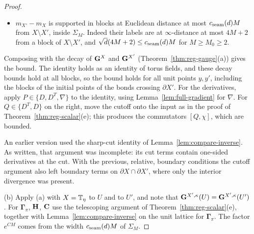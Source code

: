 \begin{proof}
\begin{itemize}
\[
[X_i^TM_iY_i,\chi]=[X_i^T,\chi]M_iY_i+X_i^T[M_i,\chi]Y_i+X_i^TM_i[Y_i,\chi].
\]
The commutators of $D$ and $D^T$ with $\chi$ are bounded and supported where $\partial\chi\ne0$. If $M_i$ has decay $(C,\gamma)$, then $\|\one_y[M_i,\chi]\one_{y'}\|\le2Ce^{-\gamma|y-y'|}$, and it vanishes unless $y$ or $y'$ lies within distance $3+\sqrt d$ of $X\setminus X'$; so $[M_i,\chi]$ has the seam form. The derivative $X_i^T$ on the left is absorbed by $\bG^{X'}$, since $\bG^{X'}D^T$ and $\bG^{X'}D$ decay (Theorem~\ref{thm:reg-gauge}(a)). The derivative $Y_i$ on the right falls on $u$, and $D\bG^X$, $D^T\bG^X$ decay. With $P$ on the left and $Q$ on the right, as below, the products $P\bG^{X'}X_i^T$ and $Y_i\bG^XQ$ also decay.
\item $m_{X'}-m_X$ is supported in blocks at Euclidean distance at most $c_{\rm seam}(d)M$ from $X\setminus X'$, inside $\Sigma_M$. Indeed their labels are at $\infty$-distance at most $4M+2$ from a block of $X\setminus X'$, and $\sqrt d(4M+2)\le c_{\rm seam}(d)M$ for $M\ge M_0\ge2$.
\end{itemize}
Composing with the decay of $\mathbf G^X$ and $\bG^{X'}$ (Theorem~\ref{thm:reg-gauge}(a)) gives the bound. The identity holds as an identity of torus fields, and these decay bounds hold at all blocks, so the bound holds for all unit points $y,y'$, including the blocks of the initial points of the bonds crossing $\partial X'$. For the derivatives, apply $P\in\{D,D^T,\nabla\}$ to the identity, using Lemma~\ref{lem:full-gradient} for $\nabla$. For $Q\in\{D^T,D\}$ on the right, move the cutoff onto the input as in the proof of Theorem~\ref{thm:reg-scalar}(e); this produces the commutators $[Q,\chi]$, which are bounded.

An earlier version used the sharp-cut identity of Lemma~\ref{lem:compare-inverse}. As written, that argument was incomplete: its cut terms contain one-sided derivatives at the cut. With the previous, relative, boundary conditions the cutoff argument also left boundary terms on $\partial X\cap\partial X'$, where only the interior divergence was present.

(b) Apply (a) with $X=\mathbb T_\eta$ to $U$ and to $U'$, and note that $\mathbf G^{X',\kappa}(U)=\mathbf G^{X',\kappa}(U')$. For $\boldsymbol\Gamma_\pi$, $\mathbf H$, $\mathbf C$ use the telescoping argument of Theorem~\ref{thm:reg-scalar}(e), together with Lemma~\ref{lem:compare-inverse} on the unit lattice for $\boldsymbol\Gamma_\pi$. The factor $e^{CM}$ comes from the width $c_{\rm seam}(d)M$ of $\Sigma_M$.
\end{proof}

